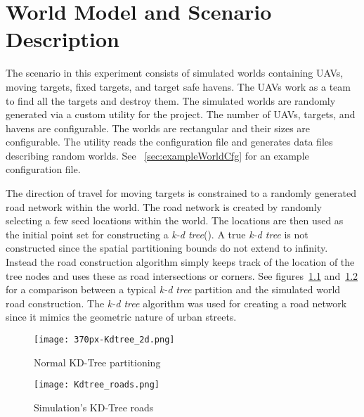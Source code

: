 \chapter{World Model and Scenario Description}

The scenario in this experiment consists of simulated worlds containing UAVs, moving targets, fixed targets, and target safe havens.  The UAVs work as a team to find all the targets and destroy them.  The simulated worlds are randomly generated via a custom utility for the project.  The number of UAVs, targets, and havens are configurable.  The worlds are rectangular and their sizes are configurable.  The utility reads the configuration file and generates data files describing random worlds.  See ~\ref{sec:exampleWorldCfg} for an example configuration file.

The direction of travel for moving targets is constrained to a randomly generated road network within the world.  The road network is created by randomly selecting a few seed locations within the world.  The locations are then used as the initial point set for constructing a \textit{k-d tree}(\cite{wiki:kdtree}).  A true \textit{k-d tree} is not constructed since the spatial partitioning bounds do not extend to infinity.  Instead the road construction algorithm simply keeps track of the location of the tree nodes and uses these as road intersections or corners.  See figures~\ref{fig:kdtree} and~\ref{fig:kdtreeroads} for a comparison between a typical \textit{k-d tree} partition and the simulated world road construction.  The \textit{k-d tree} algorithm was used for creating a road network since it mimics the geometric nature of urban streets.

\begin{figure}[h]
	\centering
	\texttt{[image: 370px-Kdtree\_2d.png]}
	\caption{Normal KD-Tree partitioning\protect\footnotemark}
	\label{fig:kdtree}
\end{figure}

\begin{figure}[h]
	\centering
	\texttt{[image: Kdtree\_roads.png]}
	\caption{Simulation's KD-Tree roads}
	\label{fig:kdtreeroads}
\end{figure}


